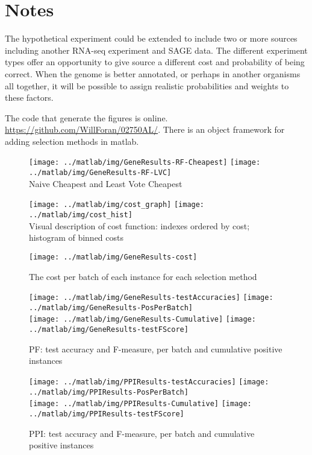 \documentclass[10pt,a4pape r]{article}
\begin{document}
  \section{Notes}
The hypothetical experiment could be extended to include two or more sources including another RNA-seq experiment and SAGE data. The different experiment types offer an opportunity to give source a different cost and probability of being correct. When the genome is better annotated, or perhaps in another organisms all together, it will be possible to assign realistic probabilities and weights to these factors.

The code that generate the figures is online. \url{https://github.com/WillForan/02750AL/}. There is an object framework for adding selection methods in matlab.
\begin{figure}[p]
\texttt{[image: ../matlab/img/GeneResults-RF-Cheapest]}
\texttt{[image: ../matlab/img/GeneResults-RF-LVC]} \\
\caption{Naive Cheapest and Least Vote Cheapest}
\texttt{[image: ../matlab/img/cost\_graph]} 
\texttt{[image: ../matlab/img/cost\_hist]} \\
\caption{Visual description of cost function: indexes ordered by cost; histogram of binned costs}
\texttt{[image: ../matlab/img/GeneResults-cost]}
\caption{\label{Cost}The cost per batch of each instance for each selection method}
\end{figure}
\begin{figure}[p]
\texttt{[image: ../matlab/img/GeneResults-testAccuracies]}
\texttt{[image: ../matlab/img/GeneResults-PosPerBatch]}\\
\texttt{[image: ../matlab/img/GeneResults-Cumulative]}
\texttt{[image: ../matlab/img/GeneResults-testFScore]}
\caption{\label{PF}PF: test accuracy and F-measure, per batch and cumulative positive instances}
\end{figure}
\begin{figure}[p]
\texttt{[image: ../matlab/img/PPIResults-testAccuracies]}
\texttt{[image: ../matlab/img/PPIResults-PosPerBatch]} \\
\texttt{[image: ../matlab/img/PPIResults-Cumulative]}
\texttt{[image: ../matlab/img/PPIResults-testFScore]}
\caption{\label{PPI}PPI: test accuracy and F-measure, per batch and cumulative positive instances}
\end{figure}


{}

\end{document}
